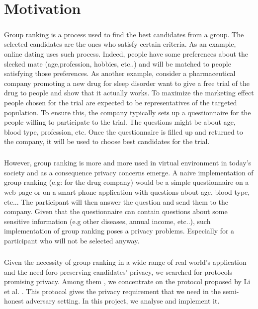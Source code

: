 \documentclass[11pt, a4paper, oneside, openright]{book} %
\begin{document}

\sloppy 

\tableofcontents

\chapter{Motivation}

\paragraph{}
Group ranking is a process used to find the best candidates from a group. The selected candidates are the ones who satisfy  certain criteria. As an example, online dating uses such process. Indeed, people have some preferences about the sleeked mate (age,profession, hobbies, etc..) and will be matched to people satisfying those preferences. As another example, consider a pharmaceutical company promoting a new drug for sleep disorder want to give a free trial of the drug to people and show that it actually works. To maximize the marketing effect people chosen for the trial are expected to be representatives of the targeted population. To ensure this, the company typically sets up a questionnaire for the people willing to participate to the trial. The questions might be about age, blood type, profession, etc. Once the questionnaire is filled up and returned to the company, it will be used to choose best candidates for the trial. 

\paragraph{}
However, group ranking is more and more used in virtual environment in today's society and as a consequence privacy concerns emerge. A naive implementation of group ranking (e.g: for the drug company) would be a simple questionnaire on a web page or on a smart-phone application with questions about age, blood type, etc... The participant will then answer the question and send them to the company. Given that the questionnaire can contain questions about some sensitive information (e.g other diseases, annual income, etc..), such implementation of group ranking poses a privacy problems. Especially for a participant who will not be selected anyway.  
 


\paragraph{}
Given the necessity of group ranking in a wide range of real world's application and the need foro preserving candidates' privacy, we searched for protocols promising privacy. Among them \cite{groupRank, algo1, algo2, algo3, algo4, algo4, algo5, algo6, algo7}, we concentrate on the protocol proposed by Li et al. \cite{groupRank}. This protocol gives the privacy requirement that we need in the semi-honest adversary setting. In this project, we analyse and implement it.
\end{document}

